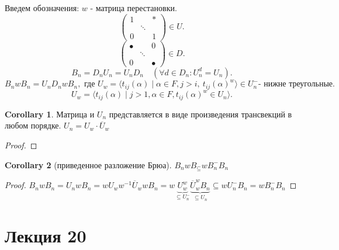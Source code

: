 \documentclass[11pt]{book}
\theoremstyle{definition}
\theoremstyle{plain}
\theoremstyle{plain}
\theoremstyle{definition}
\newtheorem*{cor}{Corollary}
\theoremstyle{remark}
\begin{document}
Введем обозначения:
    $w$ - матрица перестановки.
    \[
    \left ( 
    \begin{array}{ccc}
	1 & & * \\
	  & \ddots & \\
	0 & & 1
    \end{array}
    \right ) \in  U
    .\] 
    \[
    \left ( 
    \begin{array}{ccc}
	\bullet & & 0 \\
	  & \ddots & \\
	0 & & \bullet
    \end{array}
    \right ) \in  D
    .\] 
    \[
	B_n = D_n U_n = U_n D_n \quad (\forall d \in  D_n: U_n ^ d = U_n)
    .\] 
    \[
	B_nwB_n = U_nD_n w B_n, \mbox{ где }U_w = \langle t_{ij} (\alpha ) \mid \alpha  \in  F, j > i, ~ t_{ij} (\alpha )^w \rangle \in  U^{-}_n \mbox{- нижне треугольные}
    .\] 
    \[
	U_w = \langle t_{ij} (\alpha )\mid j > 1 , \alpha \in F, t_{ij} (\alpha  )^w \in  U_n \rangle
    .\] 
\begin{cor}
	Матрица и $U_n$ представляется     в виде произведения трансвекций в любом порядке. $U_n = U_w \cdot \overline{U}_w$  %
\end{cor}
\begin{proof}
\end{proof}
\begin{cor}
[приведенное разложение Брюа]
    $B_nwB_ \subseteq w B_n^{-} B_n$
\end{cor}
\begin{proof}
    $
    B_n w B_n = U_n w B_n = w U_w w^{-1} \overline{U}_w w B_n = w \underbrace {U_w^w}_{\subseteq U_n^{-}} \underbrace{\overline{U}_w^w B_n}_{\subseteq U_n} \subseteq w U_n^{-} B_n = w B_n^{-} B_n
	    $
\end{proof}
\section{Лекция 20}
\end{document}
